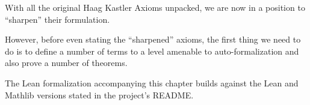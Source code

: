 With all the original Haag Kastler Axioms unpacked, we are now in a position to ``sharpen'' their formulation.

However, before even stating the ``sharpened'' axioms, the first thing we need to do is to define a number of terms to a level amenable to auto-formalization and also prove a number of theorems.

The Lean formalization accompanying this chapter builds against the Lean and Mathlib versions stated in the project's README.
